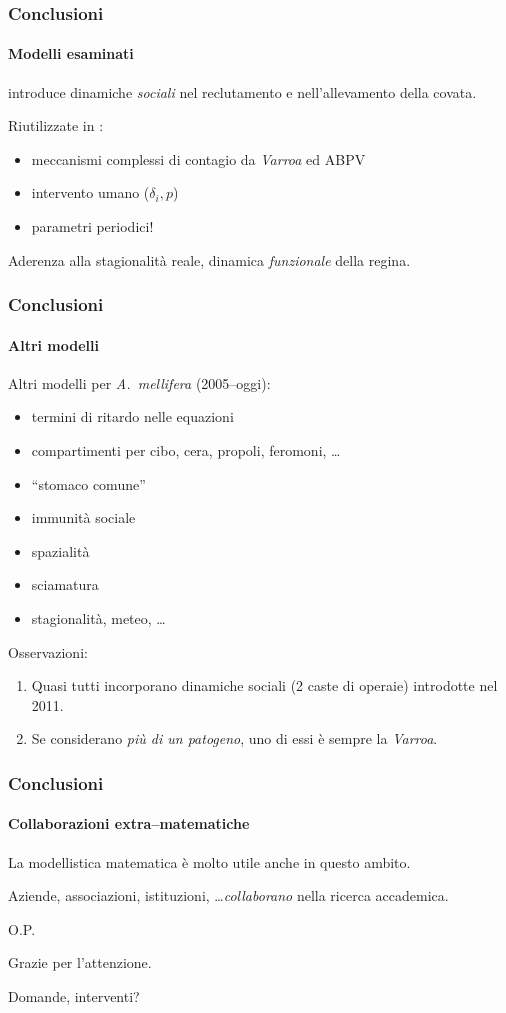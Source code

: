\documentclass[]{beamer} %
\begin{document}
\begin{frame}
    \frametitle{Conclusioni}
    \framesubtitle{Modelli esaminati}

    \cite{khoury2011} introduce dinamiche \emph{sociali} nel reclutamento e nell'allevamento della covata.

    \pause
    \vspace{1em}
    Riutilizzate in \cite{ratti2017}:
    \begin{itemize}
        \item \pause meccanismi complessi di contagio da \emph{Varroa} ed ABPV
        \item \pause intervento umano ($\delta_i, p$)
        \item \pause parametri periodici!
    \end{itemize}

    Aderenza alla stagionalità reale, \pause dinamica \emph{funzionale} della regina.
\end{frame}

\begin{frame}
    \frametitle{Conclusioni}
    \framesubtitle{Altri modelli}

    Altri modelli per \emph{A.~mellifera} (2005--oggi):
    \begin{itemize}
        \item \pause termini di ritardo nelle equazioni
        \item \pause compartimenti per cibo, cera, propoli, feromoni, \dots
        \item \pause ``stomaco comune''
        \item \pause immunità sociale
        \item \pause spazialità
        \item \pause sciamatura
        \item \pause stagionalità, meteo, \dots
    \end{itemize}

    \pause Osservazioni:
    \begin{enumerate}
        \item Quasi tutti incorporano dinamiche sociali (2 caste di operaie) introdotte nel 2011.
        \item \pause Se considerano \emph{più di un patogeno}, uno di essi è sempre \pause la \emph{Varroa}.
    \end{enumerate}
\end{frame}

\begin{frame}
    \frametitle{Conclusioni}
    \framesubtitle{Collaborazioni extra--matematiche}

    La modellistica matematica è molto utile anche in questo ambito.

    \pause
    \vspace{1em}
    Aziende, associazioni, istituzioni, \dots \emph{collaborano} nella ricerca accademica.

    \pause
    \vspace{1em}
    O.P.
\end{frame}




\begin{frame}

    \vspace{4em}
    \centering
    Grazie per l'attenzione.

    \vspace{4em}
    Domande, interventi?
\end{frame}
\end{document}
